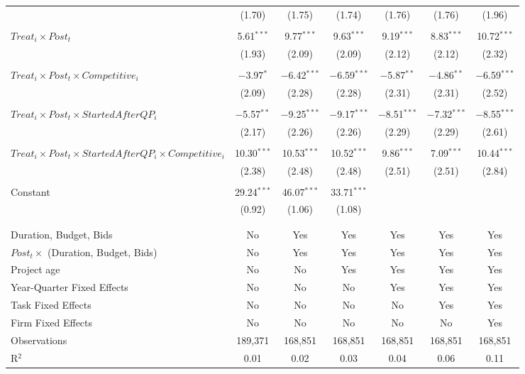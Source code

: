 \documentclass[
]{article}
\begin{document}
\begin{table}[H]
\begin{tabular}{@{\extracolsep{-3pt}}lcccccc}
  & (1.70) & (1.75) & (1.74) & (1.76) & (1.76) & (1.96) \\ 
  & & & & & & \\ 
 $Treat_i \times Post_t$ & 5.61$^{***}$ & 9.77$^{***}$ & 9.63$^{***}$ & 9.19$^{***}$ & 8.83$^{***}$ & 10.72$^{***}$ \\ 
  & (1.93) & (2.09) & (2.09) & (2.12) & (2.12) & (2.32) \\ 
  & & & & & & \\ 
 $Treat_i \times Post_t \times Competitive_i$ & $-$3.97$^{*}$ & $-$6.42$^{***}$ & $-$6.59$^{***}$ & $-$5.87$^{**}$ & $-$4.86$^{**}$ & $-$6.59$^{***}$ \\ 
  & (2.09) & (2.28) & (2.28) & (2.31) & (2.31) & (2.52) \\ 
  & & & & & & \\ 
 $Treat_i \times Post_t \times StartedAfterQP_i$ & $-$5.57$^{**}$ & $-$9.25$^{***}$ & $-$9.17$^{***}$ & $-$8.51$^{***}$ & $-$7.32$^{***}$ & $-$8.55$^{***}$ \\ 
  & (2.17) & (2.26) & (2.26) & (2.29) & (2.29) & (2.61) \\ 
  & & & & & & \\ 
 $Treat_i \times Post_t \times StartedAfterQP_i \times Competitive_i$ & 10.30$^{***}$ & 10.53$^{***}$ & 10.52$^{***}$ & 9.86$^{***}$ & 7.09$^{***}$ & 10.44$^{***}$ \\ 
  & (2.38) & (2.48) & (2.48) & (2.51) & (2.51) & (2.84) \\ 
  & & & & & & \\ 
 Constant & 29.24$^{***}$ & 46.07$^{***}$ & 33.71$^{***}$ &  &  &  \\ 
  & (0.92) & (1.06) & (1.08) &  &  &  \\ 
  & & & & & & \\ 
\hline \\[-1.8ex] 
Duration, Budget, Bids & No & Yes & Yes & Yes & Yes & Yes \\ 
$Post_t \times $  (Duration, Budget, Bids) & No & Yes & Yes & Yes & Yes & Yes \\ 
Project age & No & No & Yes & Yes & Yes & Yes \\ 
Year-Quarter Fixed Effects & No & No & No & Yes & Yes & Yes \\ 
Task Fixed Effects & No & No & No & No & Yes & Yes \\ 
Firm Fixed Effects & No & No & No & No & No & Yes \\ 
Observations & 189,371 & 168,851 & 168,851 & 168,851 & 168,851 & 168,851 \\ 
R$^{2}$ & 0.01 & 0.02 & 0.03 & 0.04 & 0.06 & 0.11 \\ 

\end{tabular}
\end{table}
\end{document}
